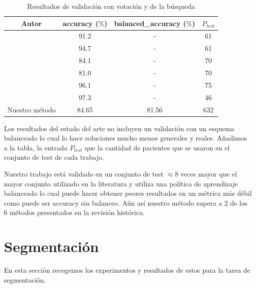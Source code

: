 \begin{table}[H]
	\centering
	\begin{tabular}{|cccc|}
		\toprule
		Autor & accuracy ($\%$) & balanced\_accuracy ($\%$) & $P_{test}$ \\
		\midrule
		\cite{cheng2015enhanced} & 91.2 & - & 61\\ 
		\cite{cheng2016retrieval} & 94.7 & - & 61\\ 
		\cite{abiwinanda2019brain} & 84.1 & - & 70\\ 
		\cite{pashaei2018brain} & 81.0 & - & 70\\ 
		\cite{sultan2019multi} & 96.1 & - & 75\\
		\cite{diaz2021deep} & 97.3 & - & 46 \\  
		Nuestro método & 84.65 & 81.56 & 632 \\ 
		\bottomrule
	\end{tabular}
	\caption{Resultados de validación con votación y de la búsqueda}
	\label{tabla:resultados12}
\end{table}

Los resultados del estado del arte no incluyen un validación con un esquema balanceado lo cual lo hace soluciones mucho menos generales y reales. Añadimos a la tabla, la entrada $P_{test}$ que la cantidad de pacientes que se usaron en el conjunto de test de cada trabajo.

Nuestro trabajo está validado en un conjunto de test $\approx 8$ veces mayor que el mayor conjunto utilizado en la literatura y utiliza una política de aprendizaje balanceado lo cual puede hacer obtener peores resultados en un métrica más débil como puede ser accuracy sin balanceo. Aún así nuestro método supera a 2 de los 6 métodos presentados en la revisión histórica.

\section{Segmentación}

En esta sección recogemos los experimentos y resultados de estos para la tarea de segmentación. 

